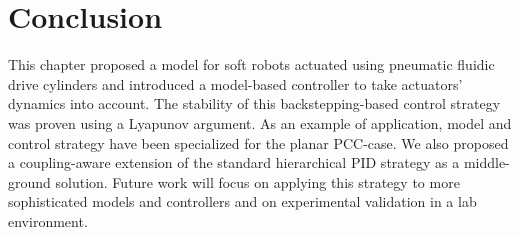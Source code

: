 \section{Conclusion}\label{sec:backstepping:conclusion}
%
This chapter proposed a model for soft robots actuated using pneumatic fluidic drive cylinders and introduced a model-based controller to take actuators' dynamics into account. The stability of this backstepping-based control strategy was proven using a Lyapunov argument.  As an example of application, model and control strategy have been specialized for the planar \gls{PCC}-case. We also proposed a coupling-aware extension of the standard hierarchical PID strategy as a middle-ground solution. %
%
Future work will focus on applying this strategy to more sophisticated models and controllers and on experimental validation in a lab environment. %